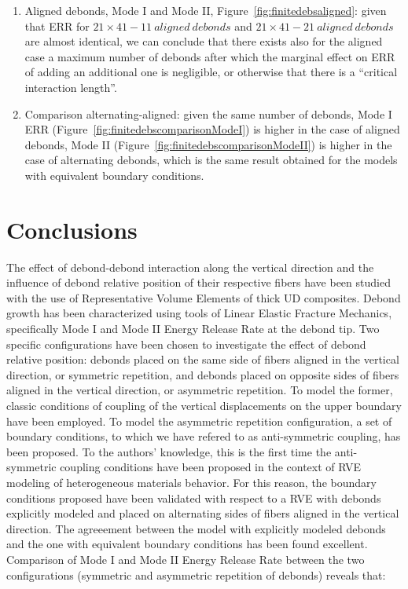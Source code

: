 \documentclass[smallextended]{svjour3}       %
\begin{document}
\begin{enumerate}
\item Aligned debonds, Mode I and Mode II, Figure~\ref{fig:finitedebsaligned}: given that ERR for $21\times41-11\ aligned\ debonds$ and $21\times41-21\ aligned\ debonds$ are almost identical, we can conclude that there exists also for the aligned case a maximum number of debonds after which the marginal effect on ERR of adding an additional one is negligible, or otherwise that there is a ``critical interaction length''.
\item Comparison alternating-aligned: given the same number of debonds, Mode I ERR (Figure~\ref{fig:finitedebscomparisonModeI}) is higher in the case of aligned debonds, Mode II (Figure~\ref{fig:finitedebscomparisonModeII}) is higher in the case of alternating debonds, which is the same result obtained for the models with equivalent boundary conditions.
\end{enumerate}

\section{Conclusions}\label{sec:conclusions}

The effect of debond-debond interaction along the vertical direction and the influence of debond relative position of their respective fibers have been studied with the use of Representative Volume Elements of thick UD composites. Debond growth has been characterized using tools of Linear Elastic Fracture Mechanics, specifically Mode I and Mode II Energy Release Rate at the debond tip. Two specific configurations have been chosen to investigate the effect of debond relative position: debonds placed on the same side of fibers aligned in the vertical direction, or symmetric repetition, and debonds placed on opposite sides of fibers aligned in the vertical direction, or asymmetric repetition. To model the former, classic conditions of coupling of the vertical displacements on the upper boundary have been employed. To model the asymmetric repetition configuration, a set of boundary conditions, to which we have refered to as anti-symmetric coupling, has been proposed. To the authors' knowledge, this is the first time the anti-symmetric coupling conditions have been proposed in the context of RVE modeling of heterogeneous materials behavior. For this reason, the boundary conditions proposed have been validated with respect to a RVE with debonds explicitly modeled and placed on alternating sides of fibers aligned in the vertical direction. The agreeement between the model with explicitly modeled debonds and the one with equivalent boundary conditions has been found excellent.\\
Comparison of Mode I and Mode II Energy Release Rate between the two configurations (symmetric and asymmetric repetition of debonds) reveals that:
\end{document}
